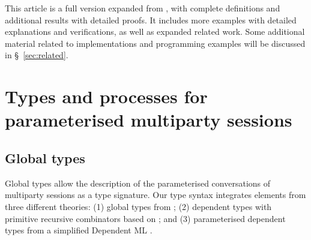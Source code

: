 \documentclass{LMCS}
\begin{document}
This article is a full version expanded from \cite{YDBH10}, with complete
definitions and additional results with detailed proofs.
It includes more examples with detailed explanations and verifications,
as well as expanded related work.
Some additional material related to implementations and programming
examples will be discussed in \S~\ref{sec:related}.


\section{Types and processes for parameterised multiparty sessions}
\label{sec:syntax_and_example}

\subsection{Global types}
\label{sec:globaltypes}
\noindent 
Global types allow the description
of the parameterised conversations of
multiparty sessions as a type signature.
Our type syntax integrates
elements from three different theories:
(1) global types from
\cite{BettiniCDLDY08LONG}; (2)
dependent types with primitive recursive combinators based on
\cite{DBLP:conf/mfps/Nelson91};
and (3) parameterised dependent types 
from a simplified Dependent ML \cite{DBLP:conf/popl/XiP99,DependentBook}.  
\end{document}
